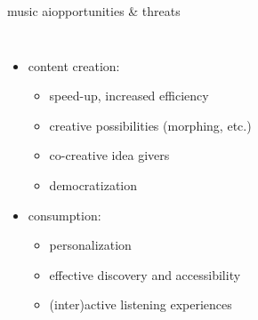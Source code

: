 \begin{frame}{music ai}{opportunities \& threats}
    \vspace{-3mm}
    \begin{columns}
    
        \begin{itemize}
            \item content creation:
                \begin{itemize}
                    \item speed-up, increased efficiency
                    \item creative possibilities (morphing, etc.)
                    \item co-creative idea givers
                    \item democratization
                \end{itemize}
            \smallskip
            \item consumption:
                \begin{itemize}
                    \item personalization
                    \item effective discovery and accessibility
                    \item (inter)active listening experiences
                \end{itemize}
        \end{itemize}
    

\end{columns}
\end{frame}

